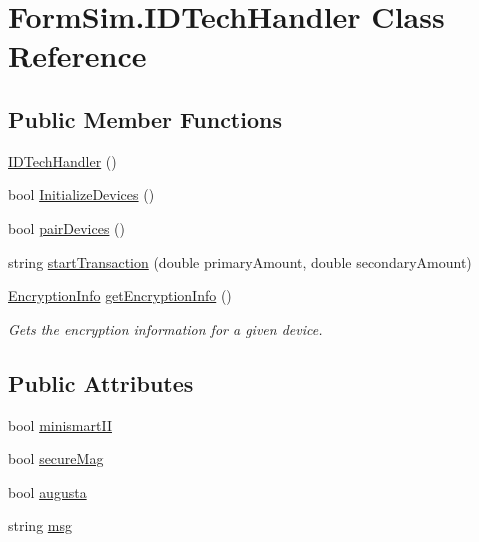 \hypertarget{class_form_sim_1_1_i_d_tech_handler}{}\section{Form\+Sim.\+I\+D\+Tech\+Handler Class Reference}
\label{class_form_sim_1_1_i_d_tech_handler}
\subsection*{Public Member Functions}
\begin{DoxyCompactItemize}
\item 
\mbox{\hyperlink{class_form_sim_1_1_i_d_tech_handler_a856e5055aaa23ef21c2c8a90f808a522}{I\+D\+Tech\+Handler}} ()
\item 
bool \mbox{\hyperlink{class_form_sim_1_1_i_d_tech_handler_a4b2e99d93096fd3a983bd4a33441846a}{Initialize\+Devices}} ()
\item 
bool \mbox{\hyperlink{class_form_sim_1_1_i_d_tech_handler_a924d82c2d844241e40329c78b800d3e7}{pair\+Devices}} ()
\item 
string \mbox{\hyperlink{class_form_sim_1_1_i_d_tech_handler_a74b0877468bc7c1e01fb60c425a8302c}{start\+Transaction}} (double primary\+Amount, double secondary\+Amount)
\item 
\mbox{\hyperlink{class_form_sim_1_1_encryption_info}{Encryption\+Info}} \mbox{\hyperlink{class_form_sim_1_1_i_d_tech_handler_a045585e87977279a3b60ef53eb07acc9}{get\+Encryption\+Info}} ()
\begin{DoxyCompactList}\small\item\em Gets the encryption information for a given device. \end{DoxyCompactList}\end{DoxyCompactItemize}
\subsection*{Public Attributes}
\begin{DoxyCompactItemize}
\item 
bool \mbox{\hyperlink{class_form_sim_1_1_i_d_tech_handler_ae4ee3560bc8a5c5d3ce011e30e8d5906}{minismart\+II}}
\item 
bool \mbox{\hyperlink{class_form_sim_1_1_i_d_tech_handler_a14a064de04694a6cc0880ac2e5a7d282}{secure\+Mag}}
\item 
bool \mbox{\hyperlink{class_form_sim_1_1_i_d_tech_handler_a030e82c9f1834c77746bab622ef63c92}{augusta}}
\item 
string \mbox{\hyperlink{class_form_sim_1_1_i_d_tech_handler_a16dfc3336bca902ad21771eebad7ce4a}{msg}}
\end{DoxyCompactItemize}
